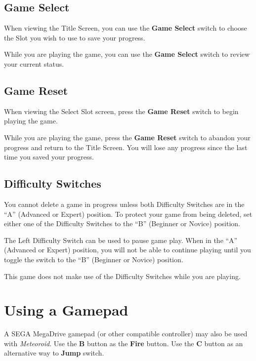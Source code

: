 \documentclass[10pt,twocolumn,openany,article]{memoir}
\begin{document}
\subsection{Game Select}

When  viewing the  Title Screen,  you can  use the  \textbf{Game Select}
switch to choose the Slot you wish to use to save your progress.

While you  are playing the  game, you  can use the  \textbf{Game Select}
switch to review your current status.

\subsection{Game Reset}

When  viewing the  Select  Slot screen,  press  the \textbf{Game  Reset}
switch to begin playing the game.

While you are playing the game,  press the \textbf{Game Reset} switch to
abandon your progress and return to  the Title Screen. You will lose any
progress since the last time you saved your progress.

\subsection{Difficulty Switches}

You cannot delete a game in progress unless both Difficulty Switches are
in the  ``A'' (Advanced or Expert)  position. To protect your  game from
being deleted,  set either one of  the Difficulty Switches to  the ``B''
(Beginner or Novice) position.

\ifdefined\TVSECAM

The Left Difficulty Switch  can be used to pause game  play. When in the
``A'' (Advanced  or Expert) position, you  will not be able  to continue
playing  until  you  toggle  the   switch  to  the  ``B''  (Beginner  or
Novice) position.

\else

This  game does  not  make  use of  the  Difficulty  Switches while  you
are playing. 

\fi

\section{Using a Gamepad}

A   SEGA  \ifdefined{}\fi{}MegaDrive   gamepad  (or   other
compatible controller) may also be used with \textit{Meteoroid}. Use the
\textbf{B} button  as the \textbf{Fire} button.  Use the \textbf{C} button  as an
alternative way to \textbf{Jump} switch.
\end{document}
